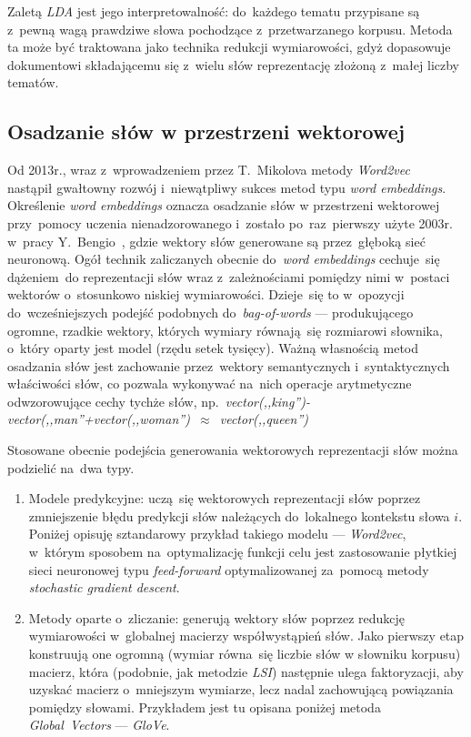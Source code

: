 \documentclass[pl]{minipw} %
\begin{document}
Zaletą \textit{LDA} jest jego interpretowalność: do~każdego tematu przypisane są z~pewną wagą prawdziwe słowa pochodzące z~przetwarzanego korpusu. Metoda ta może być traktowana jako technika redukcji wymiarowości, gdyż dopasowuje dokumentowi składającemu się z~wielu słów reprezentację złożoną z~małej liczby tematów.


\subsection{Osadzanie słów w przestrzeni wektorowej}
Od 2013r., wraz z~wprowadzeniem przez T.~Mikolova metody \textit{Word2vec}~\cite{word2vec} nastąpił gwałtowny rozwój i~niewątpliwy sukces metod typu \textit{word embeddings}. Określenie \textit{word embeddings} oznacza osadzanie słów w przestrzeni wektorowej przy~pomocy uczenia nienadzorowanego i~zostało po~raz~pierwszy użyte 2003r. w~pracy Y.~Bengio~\cite{bengio}, gdzie wektory słów generowane są przez~głęboką sieć neuronową. Ogół technik zaliczanych obecnie do~\textit{word embeddings} cechuje~się dążeniem~do reprezentacji słów wraz z~zależnościami pomiędzy nimi w~postaci wektorów o~stosunkowo niskiej wymiarowości. Dzieje~się to w~opozycji do~wcześniejszych podejść podobnych do~\textit{bag-of-words} --- produkującego ogromne, rzadkie wektory, których wymiary równają~się rozmiarowi słownika, o~który oparty jest model (rzędu setek tysięcy). Ważną własnością metod osadzania słów jest zachowanie przez~wektory semantycznych i~syntaktycznych właściwości słów, co pozwala wykonywać na~nich operacje arytmetyczne odwzorowujące cechy tychże słów, np.~\textit{vector(,,king'')-vector(,,man''+vector(,,woman'')~$\approx$~vector(,,queen'')} 

Stosowane obecnie podejścia generowania wektorowych reprezentacji słów można podzielić na~dwa typy.
\begin{enumerate}
	\item Modele predykcyjne: uczą~się wektorowych reprezentacji słów poprzez zmniejszenie błędu predykcji słów należących do~lokalnego kontekstu słowa $i$. Poniżej opisuję sztandarowy przykład takiego modelu --- \textit{Word2vec}, w~którym sposobem na~optymalizację funkcji celu jest zastosowanie płytkiej sieci neuronowej typu \textit{feed-forward} optymalizowanej za~pomocą metody \textit{stochastic gradient descent}.
	\item Metody oparte o~zliczanie: generują wektory słów poprzez redukcję wymiarowości w~globalnej macierzy współwystąpień słów.
	Jako pierwszy etap konstruują one ogromną (wymiar równa~się liczbie słów w słowniku korpusu) macierz, która (podobnie, jak  metodzie \textit{LSI}) następnie ulega faktoryzacji, aby uzyskać macierz o~mniejszym wymiarze, lecz nadal zachowującą powiązania pomiędzy słowami. Przykładem jest tu opisana poniżej metoda \textit{Global~Vectors} --- \textit{GloVe}.
\end{enumerate}
\end{document}
